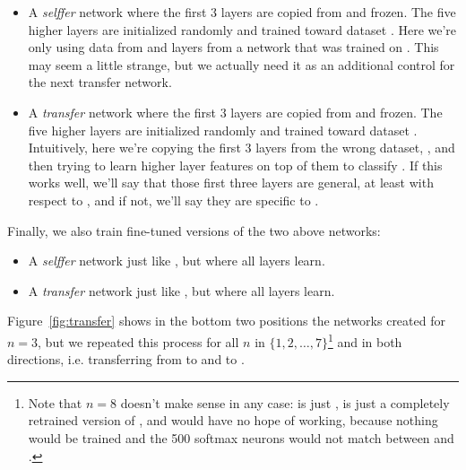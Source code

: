 \begin{itemize}
\item A \emph{selffer} network  where the first $3$ layers are copied from  and frozen. The five higher layers are initialized randomly and trained toward dataset \dB. Here we're only using data from \dB and layers from a network  that was trained on \dB. This may seem a little strange, but we actually need it as an additional control for the next transfer network.

\item A \emph{transfer} network  where the first $3$ layers are copied from  and frozen. The five higher layers are initialized randomly and trained toward dataset \dB. Intuitively, here we're copying the first $3$ layers from the wrong dataset, \dA,  and then trying to learn higher layer features on top of them to classify \dB. If this works well, we'll say that those first three layers are general, at least with respect to \dB, and if not, we'll say they are specific to \dA.
\end{itemize}

Finally, we also train fine-tuned versions of the two above networks:

\begin{itemize}
\item A \emph{selffer} network  just like , but where all layers learn.
\item A \emph{transfer} network  just like , but where all layers learn.
\end{itemize}

Figure~\ref{fig:transfer} shows in the bottom two positions the networks created for $n = 3$, but we repeated this process for all $n$ in $\{1, 2, \ldots, 7\}$\footnote{Note that $n=8$ doesn't make sense in any case:  is just ,  is just a completely retrained version of , and  would have no hope of working, because nothing would be trained and the 500 softmax neurons would not match between \dA and \dB.} and in both directions, i.e. transferring from \dA to \dB and \dB to \dA.


